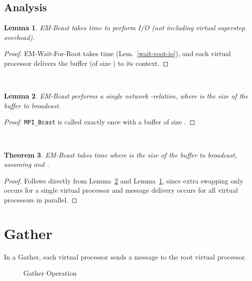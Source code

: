\documentclass[12pt]{carletoncsthesis}
\newtheorem{thm}{Theorem}[section]
\newtheorem{lemma}[thm]{Lemma}
\begin{document}
\clearpage
\subsection{Analysis}


\begin{lemma}
\label{em-bcast-io}
{\sc EM-Bcast} takes  time to
perform I/O (not including virtual superstep overhead).
\end{lemma}
\begin{proof}
{\sc EM-Wait-For-Root} takes  time
(Lem.~\ref{wait-root-io}), and each virtual processor delivers the buffer (of
size ) to its context.
\end{proof}

 \\

\begin{lemma}
\label{em-bcast-comm}
{\sc EM-Bcast} performs a single network -relation, where 
is the size of the buffer to broadcast.
\end{lemma}
\begin{proof}
{\tt MPI\_Bcast} is called exactly once with a buffer of size .
\end{proof}

 \\

\begin{thm}
\label{em-bcast-time}
{\sc EM-Bcast} takes 
time where  is the size of the buffer to broadcast, assuming 
and .
\end{thm}
\begin{proof}
Follows directly from Lemma~\ref{em-bcast-comm} and Lemma~\ref{em-bcast-io}, since
extra swapping only occurs for a single virtual processor and message delivery
occurs for all virtual processors in parallel.
\end{proof}


\clearpage
\section{Gather}


In a {\sc Gather}, each virtual processor sends a message to the root virtual
processor.

\begin{figure}[ht]
\begin{center}
\caption{Gather Operation}
\end{center}
\end{figure}
\end{document}
